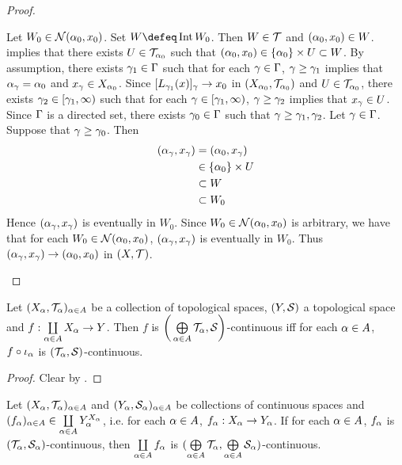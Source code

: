 \documentclass{book}
\begin{document}
\begin{proof}
\begin{itemize}
			Let $W_0 \in \mathcal{N}(\alpha_0, x_0)$. Set $W \defeq \Int W_0$. Then $W \in \mathcal{T}$ and $(\alpha_0, x_0) \in W$.  implies that there exists $U \in \mathcal{T}_{\alpha_0}$ such that $(\alpha_0, x_0) \in \{\alpha_0\} \times U \subset W$. By assumption, there exists $\gamma_1 \in \Gamma$ such that for each $\gamma \in \Gamma$, $\gamma \geq \gamma_1$ implies that $\alpha_{\gamma} = \alpha_0$ and $x_{\gamma} \in X_{\alpha_0}$. Since $[L_{\gamma_1}(x)]_{\gamma} \rightarrow x_0$ in $(X_{\alpha_0}, \mathcal{T}_{\alpha_0})$ and $U \in \mathcal{T}_{\alpha_0}$, there exists $\gamma_2 \in [\gamma_1, \infty)$ such that for each $\gamma \in [\gamma_1, \infty)$, $\gamma \geq \gamma_2$ implies that $x_{\gamma} \in U$. Since $\Gamma$ is a directed set, there exists $\gamma_0 \in \Gamma$ such that $\gamma \geq \gamma_1, \gamma_2$. Let $\gamma \in \Gamma$. Suppose that $\gamma \geq \gamma_0$. Then 
			\begin{align*}
				(\alpha_{\gamma}, x_{\gamma})
				& = (\alpha_0, x_{\gamma}) \\
				& \in \{\alpha_0\} \times U \\
				& \subset W \\
				& \subset W_0
			\end{align*}
			Hence $(\alpha_{\gamma}, x_{\gamma})$ is eventually in $W_0$. Since $W_0 \in \mathcal{N}(\alpha_0, x_0)$ is arbitrary, we have that for each $W_0 \in \mathcal{N}(\alpha_0, x_0)$, $(\alpha_{\gamma}, x_{\gamma})$ is eventually in $W_0$. Thus $(\alpha_{\gamma}, x_{\gamma}) \rightarrow (\alpha_0, x_0)$ in $(X, \mathcal{T})$.  
		\end{itemize}
	\end{proof}
	
	\begin{ex} 
		Let $(X_{\alpha}, \mathcal{T}_{\alpha})_{\alpha \in A}$ be a collection of topological spaces, $(Y, \mathcal{S})$ a topological space and $f:\coprod\limits_{\alpha \in A} X_{\alpha} \rightarrow Y$. Then $f$ is $\bigg( \bigoplus\limits_{\alpha \in A} \mathcal{T}_{\alpha}, \mathcal{S} \bigg)$-continuous iff for each $\alpha \in A$, $f \circ \iota_{\alpha}$ is $(\mathcal{T}_{\alpha}, \mathcal{S})$-continuous.
	\end{ex}
	
	\begin{proof}
		Clear by .
	\end{proof}
	
	\begin{ex} 
		Let $(X_{\alpha}, \mathcal{T}_{\alpha})_{\alpha \in A}$ and $(Y_{\alpha}, \mathcal{S}_{\alpha})_{\alpha \in A}$ be collections of continuous spaces and $(f_{\alpha})_{\alpha \in A} \in \coprod\limits_{\alpha \in A} Y_{\alpha}^{X_{\alpha}}$, i.e. for each $\alpha \in A$, $f_{\alpha}:X_{\alpha} \rightarrow Y_{\alpha}$. If for each $\alpha \in A$, $f_{\alpha}$ is $(\mathcal{T}_{\alpha}, \mathcal{S}_{\alpha})$-continuous, then $\coprod\limits_{\alpha \in A} f_{\alpha}$ is $(\bigoplus\limits_{\alpha \in A} \mathcal{T}_{\alpha}, \bigoplus\limits_{\alpha \in A} \mathcal{S}_{\alpha})$-continuous.
	\end{ex}
	
\end{document}
